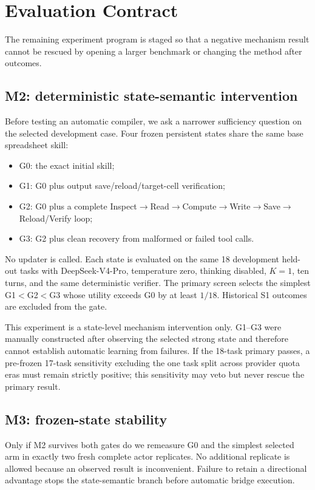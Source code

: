 \section{Evaluation Contract}
\label{sec:evaluation}

The remaining experiment program is staged so that a negative mechanism result cannot be rescued by opening a larger benchmark or changing the method after outcomes.

\subsection{M2: deterministic state-semantic intervention}
Before testing an automatic compiler, we ask a narrower sufficiency question on the selected development case. Four frozen persistent states share the same base spreadsheet skill:
\begin{itemize}
    \item G0: the exact initial skill;
    \item G1: G0 plus output save/reload/target-cell verification;
    \item G2: G0 plus a complete Inspect$\rightarrow$Read$\rightarrow$Compute$\rightarrow$Write$\rightarrow$Save$\rightarrow$Reload/Verify loop;
    \item G3: G2 plus clean recovery from malformed or failed tool calls.
\end{itemize}
No updater is called. Each state is evaluated on the same 18 development held-out tasks with DeepSeek-V4-Pro, temperature zero, thinking disabled, $K=1$, ten turns, and the same deterministic verifier. The primary screen selects the simplest G1$<$G2$<$G3 whose utility exceeds G0 by at least $1/18$. Historical S1 outcomes are excluded from the gate.

This experiment is a state-level mechanism intervention only. G1--G3 were manually constructed after observing the selected strong state and therefore cannot establish automatic learning from failures. If the 18-task primary passes, a pre-frozen 17-task sensitivity excluding the one task split across provider quota eras must remain strictly positive; this sensitivity may veto but never rescue the primary result.

\subsection{M3: frozen-state stability}
Only if M2 survives both gates do we remeasure G0 and the simplest selected arm in exactly two fresh complete actor replicates. No additional replicate is allowed because an observed result is inconvenient. Failure to retain a directional advantage stops the state-semantic branch before automatic bridge execution.

